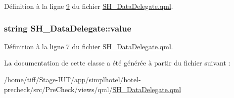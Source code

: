 Définition à la ligne \hyperlink{SH__DataDelegate_8qml_source_l00009}{9} du fichier \hyperlink{SH__DataDelegate_8qml_source}{S\-H\-\_\-\-Data\-Delegate.\-qml}.

\hypertarget{classSH__DataDelegate_acb9da3c73493c88865e08d9575f26482}{
\subsubsection[{value}]{\setlength{\rightskip}{0pt plus 5cm}string S\-H\-\_\-\-Data\-Delegate\-::value}}\label{classSH__DataDelegate_acb9da3c73493c88865e08d9575f26482}


Définition à la ligne \hyperlink{SH__DataDelegate_8qml_source_l00007}{7} du fichier \hyperlink{SH__DataDelegate_8qml_source}{S\-H\-\_\-\-Data\-Delegate.\-qml}.



La documentation de cette classe a été générée à partir du fichier suivant \-:\begin{DoxyCompactItemize}
\item 
/home/tiff/\-Stage-\/\-I\-U\-T/app/simplhotel/hotel-\/precheck/src/\-Pre\-Check/views/qml/\hyperlink{SH__DataDelegate_8qml}{S\-H\-\_\-\-Data\-Delegate.\-qml}\end{DoxyCompactItemize}
